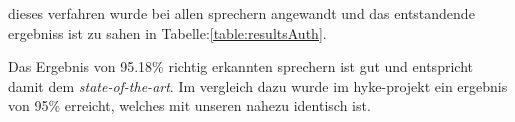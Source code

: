 dieses verfahren wurde bei allen sprechern angewandt und das entstandende ergebniss ist zu sahen in Tabelle:\ref{table:resultsAuth}.



\begin{table}[h]
\label{table:resultsAuth}
\end{table}

Das Ergebnis von 95.18\% richtig erkannten sprechern ist gut und entspricht damit dem \textit{state-of-the-art}.\cite{beigi}
Im vergleich dazu wurde im hyke-projekt ein ergebnis von 95\% erreicht, welches mit unseren nahezu identisch ist.\cite{hyke}

